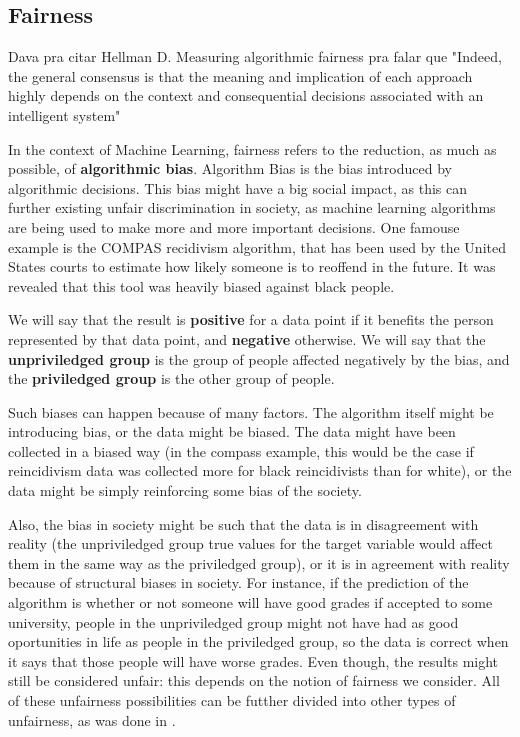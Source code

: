 \subsection{Fairness}

{\color{red} Dava pra citar Hellman D. Measuring algorithmic fairness pra falar que "Indeed, the general consensus is that the meaning and implication of each approach highly depends on the context and consequential decisions associated with an intelligent system"}

In the context of Machine Learning, fairness refers to the reduction, as much as possible, of \textbf{algorithmic bias}. Algorithm Bias is the bias introduced by algorithmic decisions. This bias might have a big social impact, as this can further existing unfair discrimination in society, as machine learning algorithms are being used to make more and more important decisions. One famouse example is the COMPAS recidivism algorithm, that has been used by the United States courts to estimate how likely someone is to reoffend in the future. It was revealed \cite{Compass} that this tool was heavily biased against black people. 

We will say that the result is \textbf{positive} for a data point if it benefits the person represented by that data point, and \textbf{negative} otherwise. We will say that the \textbf{unpriviledged group} is the group of people affected negatively by the bias, and the \textbf{priviledged group} is the other group of people.

Such biases can happen because of many factors. The algorithm itself might be introducing bias, or the data might be biased. The data might have been collected in a biased way (in the compass example, this would be the case if reincidivism data was collected more for black reincidivists than for white), or the data might be simply reinforcing some bias of the society. 

Also, the bias in society might be such that the data is in disagreement with reality (the unpriviledged group true values for the target variable would affect them in the same way as the priviledged group), or it is in agreement with reality because of structural biases in society. For instance, if the prediction of the algorithm is whether or not someone will have good grades if accepted to some university, people in the unpriviledged group might not have had as good oportunities in life as people in the priviledged group, so the data is correct when it says that those people will have worse grades. Even though, the results might still be considered unfair: this depends on the notion of fairness we consider. All of these unfairness possibilities can be futther divided into other types of unfairness, as was done in \cite{A Survey on Bias and Fairness in Machine Learning}.

